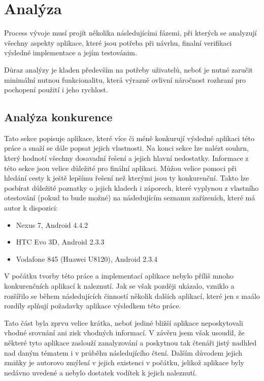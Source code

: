 \documentclass[thesis=B,czech]{FITthesis}[2013/10/20]
\begin{document}
\chapter{Analýza}

Process vývoje musí projít několika následujícími fázemi, při kterých se analyzují všechny aspekty aplikace, které jsou potřeba při návrhu, finalní verifikaci výsledné implementace a jejím testovánim. 

Důraz analýzy je kladen především na potřeby uživatelů, neboť je nutné zaručit minimální nutnou funkcionalitu, která výrazně ovlivní náročnost rozhraní pro pochopení použití i jeho rychlost.

\section{Analýza konkurence}

Tato sekce popisuje aplikace, které více či méně konkurují výsledné aplikaci této práce a snaží se dále popsat jejich vlastnosti. Na konci sekce lze nalézt souhrn, který hodnotí všechny dosavadní řešení a jejich hlavní nedostatky. Informace z této sekce jsou velice důležité pro finální aplikaci. Můžou velice pomoci při hledání cesty k ještě lepšímu řešení než kterými jsou ty konkurenční. Takto lze posbírat důležité poznatky o jejich kladech i záporech, které vyplynou z vlastního otestování (pokud to bude možné) na následujícím seznamu zařízeních, které má autor k dispozici:
\begin{itemize}
  \item{Nexus 7, Android 4.4.2}
  \item{HTC Evo 3D, Android 2.3.3}
  \item{Vodafone 845 (Huawei U8120), Android 2.3.4}
\end{itemize}

V počátku tvorby této práce a implementací aplikace nebylo příliš mnoho konkurenčních aplikací k naleznutí. Jak se však později ukázalo, vzniklo a rozšířilo se během následujících činností několik dalších aplikací, které jen s maálo rozdíly splňují požadavky aplikace výsledkem této práce.

Tato část byla zprvu velice krátka, neboť jediné bližší aplikace neposkytovali vhodné srovnání ani zisk vhodných informací. V závěru jsem však usoudil, že některé tyto aplikace zaslouží zanalyzování a poskytnou tak čtenáři jistý nadhled nad daným tématem i v průběhu následujícího čtení. Dalším důvodem jejich zmiňky je autorovo zmýlení v jejich existenci v počátku, jelikož aplikace byly nedávno uvedené a nebylo dostatek vodítek k jejich naleznutí.
\end{document}
